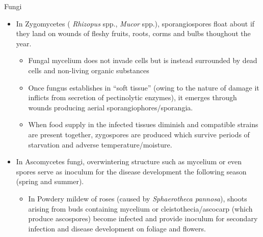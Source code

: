 \documentclass[11pt,dvipsnames,ignorenonframetext,aspectratio=169]{beamer}
\providecommand{\tightlist}{%
  \setlength{\itemsep}{0pt}\setlength{\parskip}{0pt}}
\begin{document}
\begin{frame}{Fungi}
\protect\hypertarget{fungi}{}
\small

\begin{itemize}
\tightlist
\item
  In Zygomycetes ( \emph{Rhizopus} spp., \emph{Mucor} spp.),
  sporangiospores float about if they land on wounds of fleshy fruits,
  roots, corms and bulbs thoughout the year.

  \begin{itemize}
  \tightlist
  \item
    Fungal mycelium does not invade cells but is instead surrounded by
    dead cells and non-living organic substances
  \item
    Once fungus establishes in ``soft tissue'' (owing to the nature of
    damage it inflicts from secretion of pectinolytic enzymes), it
    emerges through wounds producing aerial sporangiophores/sporangia.
  \item
    When food supply in the infected tissues diminish and compatible
    strains are present together, zygospores are produced which survive
    periods of starvation and adverse temperature/moisture.
  \end{itemize}
\item
  In Ascomycetes fungi, overwintering structure such as mycelium or even
  spores serve as inoculum for the disease development the following
  season (spring and summer).

  \begin{itemize}
  \tightlist
  \item
    In Powdery mildew of roses (caused by \emph{Sphaerotheca pannosa}),
    shoots arising from buds containing mycelium or
    cleistothecia/ascocarp (which produce ascospores) become infected
    and provide inoculum for secondary infection and disease development
    on foliage and flowers.
  \end{itemize}
\end{itemize}
\end{frame}
\end{document}
